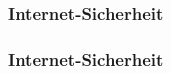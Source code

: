 \begin{frame}
\frametitle{Internet-Sicherheit}
\begin{itemize}
  
\end{itemize}
\end{frame}

\begin{frame}
\frametitle{Internet-Sicherheit}
\begin{itemize}
  
\end{itemize}
\end{frame}